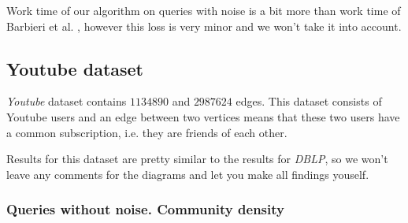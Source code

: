   \begin{center}
  \end{center}

Work time of our algorithm on queries with noise is a bit more than work time of Barbieri et al. \cite{Barbieri15}, however this loss is very minor and we won't take it into account.

\subsection{Youtube dataset}

\textit{Youtube} dataset contains $1134890$ and $2987624$ edges. This dataset consists of Youtube users and an edge between two vertices means that these two users have a common subscription, i.e. they are friends of each other.

Results for this dataset are pretty similar to the results for \textit{DBLP}, so we won't leave any comments for the diagrams and let you make all findings youself.

\subsubsection{Queries without noise. Community density}

